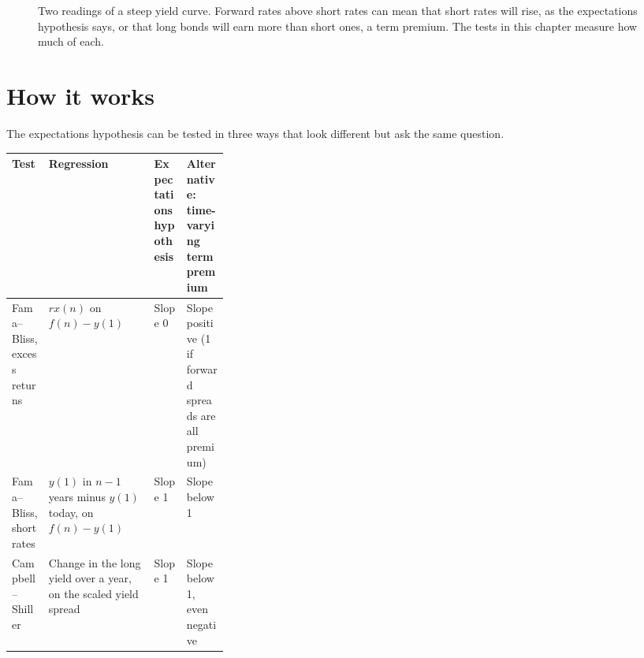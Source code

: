 \begin{figure}[htbp]
\centering
{}
\caption{Two readings of a steep yield curve. Forward rates above short rates can mean that short rates will rise, as the expectations hypothesis says, or that long bonds will earn more than short ones, a term premium. The tests in this chapter measure how much of each.}
\label{fig:16-readings}
\end{figure}

\section{How it works}
\label{sec:16-how}

The expectations hypothesis can be tested in three ways that look different but ask the same question.

\begin{center}
\small
\begin{tabularx}{0.9\linewidth}{@{}>{\raggedright\arraybackslash}p{0.17\linewidth}>{\raggedright\arraybackslash}X>{\raggedright\arraybackslash}p{0.15\linewidth}>{\raggedright\arraybackslash}X@{}}
\toprule
Test & Regression & Expectations hypothesis & Alternative: time-varying term premium \\
\midrule
Fama--Bliss, excess returns & $rx(n)$ on $f(n) - y(1)$ & Slope 0 & Slope positive (1 if forward spreads are all premium) \\
Fama--Bliss, short rates & $y(1)$ in $n-1$ years minus $y(1)$ today, on $f(n) - y(1)$ & Slope 1 & Slope below 1 \\
Campbell--Shiller & Change in the long yield over a year, on the scaled yield spread & Slope 1 & Slope below 1, even negative \\
\bottomrule
\end{tabularx}
\end{center}


